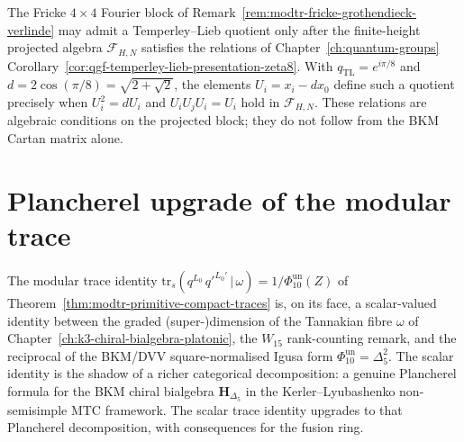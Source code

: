\begin{remark}
\label{rem:modtr-temperley-lieb-fricke-block}
The Fricke $4\times 4$ Fourier block of
Remark~\ref{rem:modtr-fricke-grothendieck-verlinde} may admit a
Temperley--Lieb quotient only after the finite-height projected algebra
\(\mathcal F_{H,N}\) satisfies the relations of
Chapter~\ref{ch:quantum-groups}
Corollary~\ref{cor:qgf-temperley-lieb-presentation-zeta8}. With
\(q_{\mathrm{TL}}=e^{i\pi/8}\) and
\(d=2\cos(\pi/8)=\sqrt{2+\sqrt2}\), the elements
\(U_i=x_i-dx_0\) define such a quotient precisely when
\(U_i^2=dU_i\) and \(U_iU_jU_i=U_i\) hold in \(\mathcal F_{H,N}\).
These relations are algebraic conditions on the projected block; they
do not follow from the BKM Cartan matrix alone.
\end{remark}

\section{Plancherel upgrade of the modular trace}
\label{sec:modtr-plancherel-kl}

The modular trace identity
$\mathrm{tr}_s(q^{L_0}\, q'^{L_0'}\,|\,\omega)
= 1/\Phi_{10}^{\mathrm{un}}(Z)$
of Theorem~\ref{thm:modtr-primitive-compact-traces} is, on its face,
a scalar-valued
identity between the graded (super-)dimension of the Tannakian fibre
$\omega$ of
Chapter~\ref{ch:k3-chiral-bialgebra-platonic},
the $W_{15}$ rank-counting remark, and the reciprocal of the
BKM/DVV square-normalised Igusa form
\(\Phi_{10}^{\mathrm{un}}=\Delta_5^2\). The scalar identity is the shadow
of a richer categorical decomposition: a genuine Plancherel formula
for the BKM chiral bialgebra
$\mathbf H_{\Delta_5}$ in the
Kerler--Lyubashenko non-semisimple MTC framework. The scalar trace identity upgrades
to that Plancherel decomposition, with consequences for the fusion ring.


